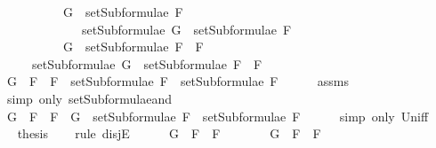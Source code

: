 \begin{isabellebody}
\ \ \ \ \ \ \ \ \ \ {\isachardoublequoteopen}G\ {\isasymin}\ setSubformulae\ F{}\ \isanewline
\ \ \ \ \ \ \ \ \ \ \ \ {\isasymLongrightarrow}\ setSubformulae\ G\ {\isasymsubseteq}\ setSubformulae\ F{}{\isachardoublequoteclose}\isanewline
\ \ \ \ \ \ \ \ \ \ {\isachardoublequoteopen}G\ {\isasymin}\ setSubformulae\ {\isacharparenleft}F{}\ \isactrlbold {\isasymand}\ F{}{\isacharparenright}{\isachardoublequoteclose}\isanewline
\ \ \ \ \ {\isachardoublequoteopen}setSubformulae\ G\ {\isasymsubseteq}\ setSubformulae\ {\isacharparenleft}F{}\ \isactrlbold {\isasymand}\ F{}{\isacharparenright}{\isachardoublequoteclose}\isanewline
%
\isadelimproof
%
\endisadelimproof
%
\isatagproof
{}\isamarkupfalse%
\ {\isacharminus}\isanewline
\ \ \isamarkupfalse%
\ {\isachardoublequoteopen}G\ {\isasymin}\ {\isacharbraceleft}F{}\ \isactrlbold {\isasymand}\ F{}{\isacharbraceright}\ {\isasymunion}\ {\isacharparenleft}setSubformulae\ F{}\ {\isasymunion}\ setSubformulae\ F{}{\isacharparenright}{\isachardoublequoteclose}\isanewline
\ \ \ \ \isamarkupfalse%
\ assms{\isacharparenleft}{}{\isacharparenright}\ \isanewline
\ \ \ \ \isamarkupfalse%
\ {\isacharparenleft}simp\ only{\isacharcolon}\ setSubformulae{\isacharunderscore}and{\isacharparenright}\isanewline
\ \ \isamarkupfalse%
\ \isamarkupfalse%
\ {\isachardoublequoteopen}G\ {\isasymin}\ {\isacharbraceleft}F{}\ \isactrlbold {\isasymand}\ F{}{\isacharbraceright}\ {\isasymor}\ G\ {\isasymin}\ setSubformulae\ F{}\ {\isasymunion}\ setSubformulae\ F{}{\isachardoublequoteclose}\isanewline
\ \ \ \ \isamarkupfalse%
\ {\isacharparenleft}simp\ only{\isacharcolon}\ Un{\isacharunderscore}iff{\isacharparenright}\isanewline
\ \ \isamarkupfalse%
\ \isamarkupfalse%
\ {\isacharquery}thesis\isanewline
\ \ \isamarkupfalse%
\ {\isacharparenleft}rule\ disjE{\isacharparenright}\isanewline
\ \ \ \ \isamarkupfalse%
\ {\isachardoublequoteopen}G\ {\isasymin}\ {\isacharbraceleft}F{}\ \isactrlbold {\isasymand}\ F{}{\isacharbraceright}{\isachardoublequoteclose}\isanewline
\ \ \ \ \isamarkupfalse%
\ \isamarkupfalse%
\ {\isachardoublequoteopen}G\ {\isacharequal}\ F{}\ \isactrlbold {\isasymand}\ F{}{\isachardoublequoteclose}\isanewline

\end{isabellebody}
